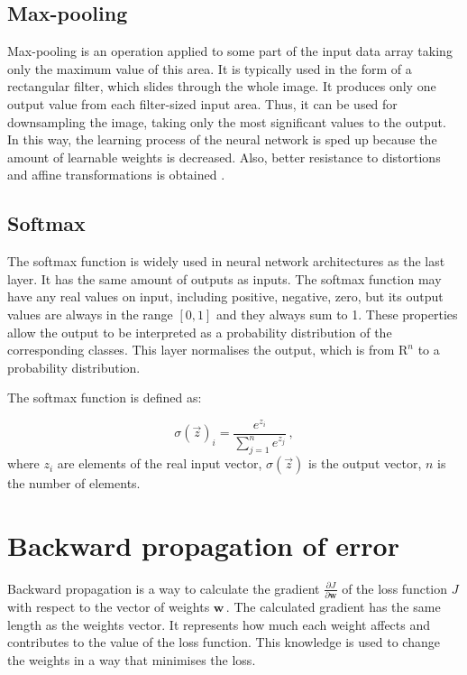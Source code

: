 \subsection{Max-pooling}

Max-pooling is an operation applied to some part of the input data array taking only the maximum value of this area. It is typically used in the form of a rectangular filter, which slides through the whole image. It produces only one output value from each filter-sized input area. Thus, it can be used for downsampling the image, taking only the most significant values to the output. In this way, the learning process of the neural network is sped up because the amount of learnable weights is decreased. Also, better resistance to distortions and affine transformations is obtained \cite{yu2014mixed}.

\subsection{Softmax}

The softmax function is widely used in neural network architectures as the last layer. It has the same amount of outputs as inputs. The softmax function may have any real values on input, including positive, negative, zero, but its output values are always in the range $[0, 1]$ and they always sum to 1. These properties allow the output to be interpreted as a probability distribution of the corresponding classes. This layer normalises the output, which is from $\textrm{R}^n$ to a probability distribution.

The softmax function is defined as:

\begin{equation}
	\sigma(\vec z)_i = \frac{e^{z_i}}{\sum\limits_{j=1}^n e^{z_j}}\,,
\end{equation}
where $z_i$ are elements of the real input vector, $\sigma(\vec z)$ is the output vector, $n$ is the number of elements.




\section{Backward propagation of error}
\label{backprop}

Backward propagation is a way to calculate the gradient $\frac{\partial J}{\partial \textbf{w}}$ of the loss function $J$ with respect to the vector of weights $\textbf{w}$\,. The calculated gradient has the same length as the weights vector. It represents how much each weight affects and contributes to the value of the loss function. This knowledge is used to change the weights in a way that minimises the loss. 

